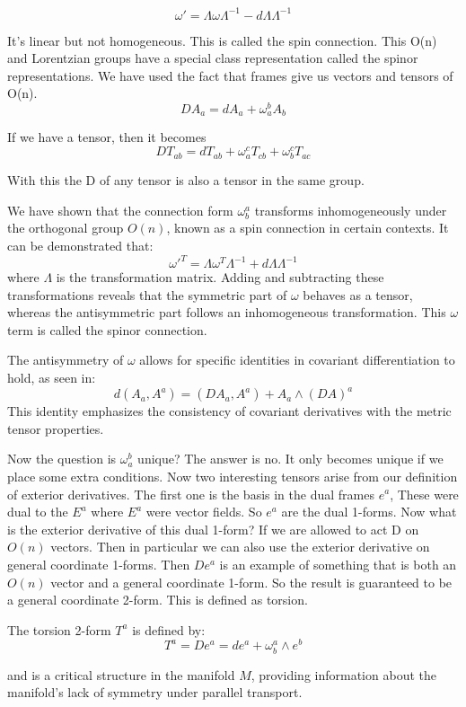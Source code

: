 \documentclass{article}
\begin{document}
\[
\omega' = \Lambda \omega \Lambda^{-1} - d\Lambda \Lambda^{-1}
\]

It's linear but not homogeneous. This is called the spin connection. This O(n) and Lorentzian groups have a special class representation called the spinor representations. We have used the fact that frames give us vectors and tensors of O(n). 
\[ DA_a = dA_a + \omega^b_a A_b \] 

If we have a tensor, then it becomes 
\[ DT_{ab} = dT_{ab} + \omega^c_a T_{cb} + \omega^c_b T_{ac} \]

With this the D of any tensor is also a tensor in the same group. 

We have shown that the connection form \(\omega^a_b\) transforms inhomogeneously under the orthogonal group \(O(n)\), known as a spin connection in certain contexts. It can be demonstrated that:
\[
\omega'^T = \Lambda \omega^T \Lambda^{-1} + d\Lambda \Lambda^{-1}
\]
where \(\Lambda\) is the transformation matrix. Adding and subtracting these transformations reveals that the symmetric part of \(\omega\) behaves as a tensor, whereas the antisymmetric part follows an inhomogeneous transformation. This \( \omega\) term is called the spinor connection. 

The antisymmetry of \(\omega\) allows for specific identities in covariant differentiation to hold, as seen in:
\[
d(A_a, A^a) = (DA_a, A^a) + A_a \wedge (DA)^a
\]
This identity emphasizes the consistency of covariant derivatives with the metric tensor properties.

Now the question is \( \omega^b_a \) unique? The answer is no. It only becomes unique if we place some extra conditions. Now two interesting tensors arise from our definition of exterior derivatives. The first one is the basis in the dual frames \( e^a \), These were dual to the \( E^a \) where \( E^a \) were vector fields. So \( e^a \) are the dual 1-forms. Now what is the exterior derivative of this dual 1-form? If we are allowed to act D on \( O(n) \) vectors. Then in particular we can also use the exterior derivative on general coordinate 1-forms. Then \( D e^a \) is an example of something that is both an \( O(n) \) vector and a general coordinate 1-form. So the result is guaranteed to be a general coordinate 2-form. This is defined as torsion. 

\begin{theorem}

The torsion 2-form \( T^a \) is defined by:
\[
T^a = D e^a = de^a + \omega^a_b \wedge e^b
\]

\end{theorem}
and is a critical structure in the manifold \(M\), providing information about the manifold's lack of symmetry under parallel transport.
\end{document}
